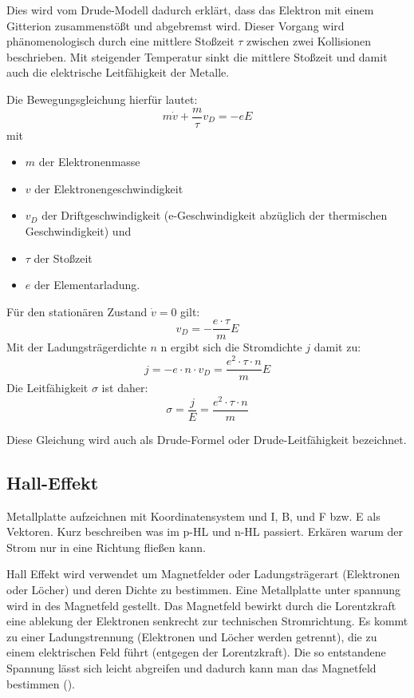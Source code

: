 Dies wird vom Drude-Modell dadurch erklärt, dass das Elektron mit einem Gitterion zusammenstößt und abgebremst wird. Dieser Vorgang wird phänomenologisch durch eine mittlere Stoßzeit $\tau$ zwischen zwei Kollisionen beschrieben. Mit steigender Temperatur sinkt die mittlere Stoßzeit und damit auch die elektrische Leitfähigkeit der Metalle.

Die Bewegungsgleichung hierfür lautet:
\begin{equation}
    m \dot v + \frac{m}{\tau} v_D = -eE
\end{equation}
mit
\begin{itemize}
    \item $m$ der Elektronenmasse
    \item $v$ der Elektronengeschwindigkeit
    \item $v_D$ der Driftgeschwindigkeit (e-Geschwindigkeit abzüglich der thermischen Geschwindigkeit) und
    \item $\tau$ der Stoßzeit
    \item $e$ der Elementarladung.
\end{itemize}
Für den stationären Zustand $\dot v=0$ gilt:
\begin{equation}
    v_D = -\frac{e\cdot \tau}{m}E
\end{equation}
Mit der Ladungsträgerdichte $n$ n ergibt sich die Stromdichte $j$ damit zu:
\begin{equation}
    j = -e \cdot n \cdot v_D = \frac{e^2 \cdot \tau \cdot n}{m}E
\end{equation}
Die Leitfähigkeit $\sigma$ ist daher:
\begin{equation}
    \sigma = \frac{j}{E} = \frac{e^2 \cdot \tau \cdot n}{m}
\end{equation}

Diese Gleichung wird auch als Drude-Formel oder Drude-Leitfähigkeit bezeichnet. 

\subsection{Hall-Effekt }\label{k3:halleffekt}
Metallplatte aufzeichnen mit Koordinatensystem und I, B, und F bzw. E als Vektoren.
Kurz beschreiben was im p-HL und n-HL passiert.
Erk\"aren warum der Strom nur in eine Richtung flie{\ss}en kann.

Hall Effekt wird verwendet um Magnetfelder oder Ladungsträgerart (Elektronen oder L\"ocher) und deren Dichte zu bestimmen.
Eine Metallplatte unter spannung wird in des Magnetfeld gestellt.
Das Magnetfeld bewirkt durch die Lorentzkraft eine ablekung der Elektronen senkrecht zur technischen Stromrichtung.
Es kommt zu einer Ladungstrennung (Elektronen und Löcher werden getrennt), die zu einem elektrischen Feld führt (entgegen der
Lorentzkraft). Die so entstandene Spannung lässt sich leicht abgreifen und dadurch kann man das Magnetfeld bestimmen
().

